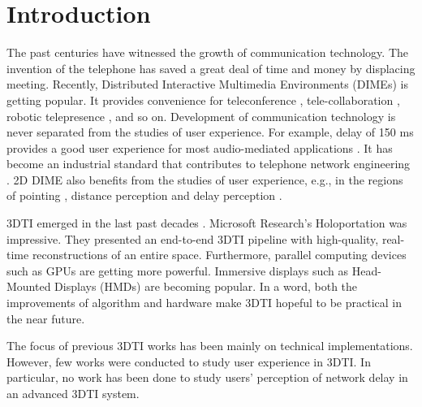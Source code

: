 \section{Introduction}


The past centuries have witnessed the growth of communication technology. The invention of the telephone has saved a great deal of time and money by displacing meeting. Recently, Distributed Interactive Multimedia Environments (DIMEs) is getting popular. It provides convenience for teleconference \cite{marlow2016beyond}, tele-collaboration \cite{donovan2014understanding, avellino2015accuracy}, robotic telepresence \cite{jouppi2001robotic, misawa2015chameleonmask, neustaedter2016beam}, and so on. Development of communication technology is never separated from the studies of user experience. For example, delay of 150 ms provides a good user experience for most audio-mediated applications \cite{recommendation2003114, donovan2014understanding}. It has become an industrial standard that contributes to telephone network engineering \cite{itu2003recommendation}. 2D DIME also benefits from the studies of user experience, e.g., in the regions of pointing \cite{higuchi2015immerseboard, avellino2015accuracy}, distance perception \cite{boustila2015evaluation, alexandrova2010egocentric} and delay perception \cite{geerts2011we, tam2012video, schmitt2014influence}.

3DTI emerged in the last past decades \cite{kurillo2008immersive, petit2010multicamera, maimone2011encumbrance, maimone2012real}. Microsoft Research's Holoportation \cite{orts2016holoportation} was impressive. They presented an end-to-end 3DTI pipeline with high-quality, real-time reconstructions of an entire space. Furthermore, parallel computing devices such as GPUs are getting more powerful. Immersive displays such as Head-Mounted Displays (HMDs) are becoming popular. In a word, both the improvements of algorithm and hardware make 3DTI hopeful to be practical in the near future.


The focus of previous 3DTI works has been mainly on technical implementations. However, few works were conducted to study user experience in 3DTI. In particular, no work has been done to study users' perception of network delay in an advanced 3DTI system.

